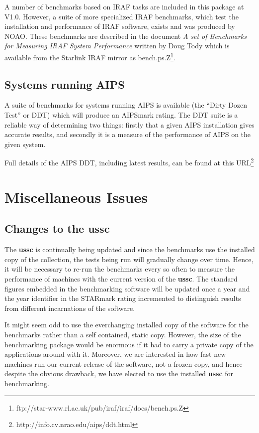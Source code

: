 \documentclass[11pt]{article}
\newcommand{\htmladdnormallinkfoot}[2]{#1\footnote{#2}}
\begin{document}
A number of benchmarks based on IRAF tasks are included in this package
at V1.0. However, a suite of more specialized IRAF benchmarks, which
test the installation and performance of IRAF software, exists and was
produced by NOAO. These benchmarks are described in the document {\em A
set of Benchmarks for Measuring IRAF System Performance} written by
Doug Tody which is available from the Starlink IRAF mirror as
\htmladdnormallinkfoot{bench.ps.Z}{ftp://star-www.rl.ac.uk/pub/iraf/iraf/docs/bench.ps.Z}.


\subsection{Systems running AIPS}

A suite of benchmarks for systems running AIPS is available (the ``Dirty Dozen
Test'' or DDT) which will produce an AIPSmark rating. 
The DDT suite is a reliable way of determining two things: 
firstly that a given AIPS installation gives accurate results, and 
secondly it is a measure of the performance of AIPS on the given system. 

Full details of the AIPS DDT, including latest results, can be found  \htmladdnormallinkfoot{at this URL}{http://info.cv.nrao.edu/aips/ddt.html}

\section{Miscellaneous Issues}

\subsection{Changes to the ussc}
\label{ussc-changes}

The {\bf ussc} is continually being updated and since the benchmarks use the 
installed copy of the collection, the tests being run will gradually
change over time. Hence, it will be necessary to re-run the benchmarks
every so often to measure the performance of machines with the current
version of the {\bf ussc}. The standard figures embedded in the benchmarking
software will be updated once a year and the year identifier in the
STARmark rating incremented to distinguish results from different 
incarnations of the software.

It might seem odd to use the everchanging installed copy of the 
software for the benchmarks rather than a self contained, static copy.
However, the size of the benchmarking package would be enormous if
it had to carry a private copy of the applications around with it.
Moreover, we are interested in how fast new machines run our current
release of the software, not a frozen copy, and hence despite the
obvious drawback, we have elected to use the installed {\bf ussc} for
benchmarking.
\end{document}

